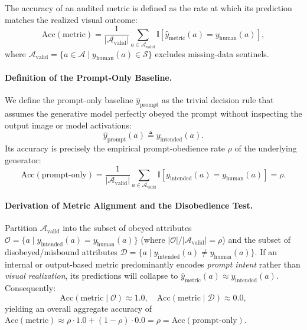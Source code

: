The accuracy of an audited metric is defined as the rate at which its prediction matches the realized visual outcome:
\begin{equation}
\text{Acc}(\text{metric}) = \frac{1}{|\mathcal{A}_{\text{valid}}|} \sum_{a \in \mathcal{A}_{\text{valid}}} \mathbb{I}\left[\hat{y}_{\text{metric}}(a) = y_{\text{human}}(a)\right],
\end{equation}
where $\mathcal{A}_{\text{valid}} = \{a \in \mathcal{A} \mid y_{\text{human}}(a) \in \mathcal{S}\}$ excludes missing-data sentinels.

\paragraph{Definition of the Prompt-Only Baseline.} We define the prompt-only baseline $\hat{y}_{\text{prompt}}$ as the trivial decision rule that assumes the generative model perfectly obeyed the prompt without inspecting the output image or model activations:
\begin{equation}
\hat{y}_{\text{prompt}}(a) \triangleq y_{\text{intended}}(a).
\end{equation}
Its accuracy is precisely the empirical prompt-obedience rate $\rho$ of the underlying generator:
\begin{equation}
\text{Acc}(\text{prompt-only}) = \frac{1}{|\mathcal{A}_{\text{valid}}|} \sum_{a \in \mathcal{A}_{\text{valid}}} \mathbb{I}\left[y_{\text{intended}}(a) = y_{\text{human}}(a)\right] = \rho.
\end{equation}

\paragraph{Derivation of Metric Alignment and the Disobedience Test.} Partition $\mathcal{A}_{\text{valid}}$ into the subset of obeyed attributes $\mathcal{O} = \{a \mid y_{\text{intended}}(a) = y_{\text{human}}(a)\}$ (where $|\mathcal{O}|/|\mathcal{A}_{\text{valid}}| = \rho$) and the subset of disobeyed/misbound attributes $\mathcal{D} = \{a \mid y_{\text{intended}}(a) \neq y_{\text{human}}(a)\}$. If an internal or output-based metric predominantly encodes \emph{prompt intent} rather than \emph{visual realization}, its predictions will collapse to $\hat{y}_{\text{metric}}(a) \approx y_{\text{intended}}(a)$. Consequently:
\begin{equation}
\text{Acc}(\text{metric} \mid \mathcal{O}) \approx 1.0, \quad \text{Acc}(\text{metric} \mid \mathcal{D}) \approx 0.0,
\end{equation}
yielding an overall aggregate accuracy of $\text{Acc}(\text{metric}) \approx \rho \cdot 1.0 + (1 - \rho) \cdot 0.0 = \rho = \text{Acc}(\text{prompt-only})$. 

